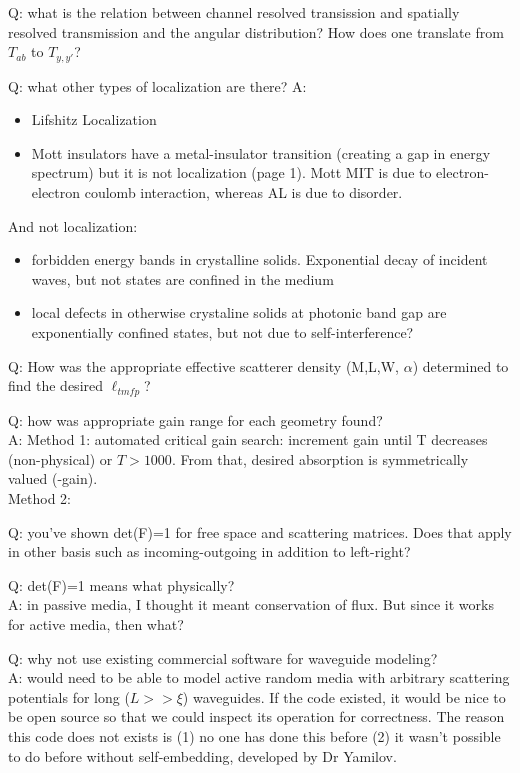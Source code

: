 \documentclass[12pt]{report} %
\begin{document}
Q: what is the relation between channel resolved transission and spatially resolved transmission and the angular distribution? How does one translate from $T_{ab}$ to $T_{y,y'}$? 

Q: what other types of localization are there?
A: 
\begin{itemize}
\item Lifshitz Localization
\item Mott insulators \cite{2003_Kettemann} have a metal-insulator transition (creating a gap in energy spectrum) but it is not localization (page 1). Mott MIT is due to electron-electron coulomb interaction, whereas AL is due to disorder.
\end{itemize}
And not localization: 
\begin{itemize}
\item forbidden energy bands in crystalline solids. Exponential decay of incident waves, but not states are confined in the medium
\item local defects in otherwise crystaline solids at photonic band gap are exponentially confined states, but not due to self-interference?
\end{itemize}

Q: How was the appropriate effective scatterer density (M,L,W, $\alpha$) determined to find the desired $\ell_{tmfp}$?

Q: how was appropriate gain range for each geometry found? \\
A: Method 1: automated critical gain search: increment gain until T decreases (non-physical) or $T>1000$. From that, desired absorption is symmetrically valued (-gain). \\
Method 2: 

Q: you've shown det(F)=1 for free space and scattering matrices. Does that apply in other basis such as incoming-outgoing in addition to left-right?


Q: det(F)=1 means what physically?  \\
A: in passive media, I thought it meant conservation of flux. But since it works for active media, then what?

Q: why not use existing commercial software for waveguide modeling? \\
A: would need to be able to model active random media with arbitrary scattering potentials for long ($L>>\xi$) waveguides. If the code existed, it would be nice to be open source so that we could inspect its operation for correctness. The reason this code does not exists is (1) no one has done this before (2) it wasn't possible to do before without self-embedding, developed by Dr Yamilov.
\end{document}
